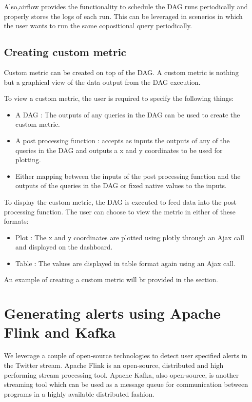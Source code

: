 \documentclass[letterpaper,10pt,english]{sphinxmanual}
\begin{document}
Also,airflow provides the functionality to schedule the DAG runs periodically and properly stores the logs of each run. This can be leveraged in scenerios in which the user wants to run the same copositional query periodically.


\section{Creating custom metric}
\label{\detokenize{dag:creating-custom-metric}}
Custom metric can be created on top of the DAG. A custom metric is nothing but a graphical view of the data output from the DAG execution.

To view a custom metric, the user is required to specify the following things:
\begin{itemize}
\item {} 
A DAG : The outputs of any queries in the DAG can be used to create the custom metric.

\item {} 
A post processing function : accepts as inputs the outputs of any of the queries in the DAG and outputs a x and y coordinates to be used for plotting.

\item {} 
Either mapping between the inputs of the post processing function and the outputs of the queries in the DAG or fixed native values to the inputs.

\end{itemize}

To display the custom metric, the DAG is executed to feed data into the post processing function. The user can choose to view the metric in either of these formats:
\begin{itemize}
\item {} 
Plot : The x and y coordinates are plotted using plotly through an Ajax call and displayed on the dashboard.

\item {} 
Table : The values are displayed in table format again using an Ajax call.

\end{itemize}

An example of creating a custom metric will br provided in the {\hyperref[\detokenize{dashboard_website:dashboard-website}]{}} section.


\chapter{Generating alerts using Apache Flink and Kafka}
\label{\detokenize{flink:generating-alerts-using-apache-flink-and-kafka}}\label{\detokenize{flink::doc}}
We leverage a couple of open-source technologies to detect user specified alerts in the Twitter stream. Apache Flink is an open-source, distributed and high performing stream processing tool. Apache Kafka, also open-source, is another streaming tool which can be used as a message queue for communication between programs in a highly available distributed fashion.
\end{document}
